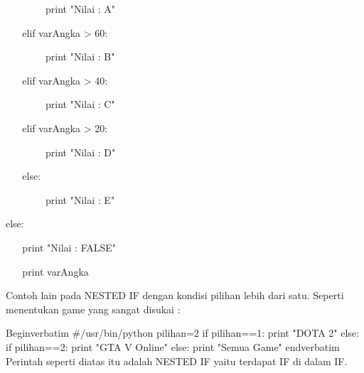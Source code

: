 \vspace{12pt}
\noindent 
 $  $  $  $  $  $  $  $  $  $  $  $  $  $  $  $  $  $  $  $  $  $  $  $ print "Nilai : A" \par
\vspace{12pt}
\noindent 
 $  $  $  $  $  $  $  $  $  $  $  $elif varAngka > 60: \par
\vspace{12pt}
\noindent 
 $  $  $  $  $  $  $  $  $  $  $  $  $  $  $  $  $  $  $  $  $  $  $  $ print "Nilai : B" \par
\vspace{12pt}
\noindent 
 $  $  $  $  $  $  $  $  $  $  $  $elif varAngka > 40: \par
\vspace{12pt}
\noindent 
 $  $  $  $  $  $  $  $  $  $  $  $  $  $  $  $  $  $  $  $  $  $  $  $ print "Nilai : C" \par
\vspace{12pt}
\noindent 
 $  $  $  $  $  $  $  $  $  $  $  $elif varAngka > 20: \par
\vspace{12pt}
\noindent 
 $  $  $  $  $  $  $  $  $  $  $  $  $  $  $  $  $  $  $  $  $  $  $  $ print "Nilai : D" \par
\vspace{12pt}
\noindent 
 $  $  $  $  $  $  $  $  $  $  $  $else: \par
\vspace{12pt}
\noindent 
 $  $  $  $  $  $  $  $  $  $  $  $  $  $  $  $  $  $  $  $  $  $  $  $ print "Nilai : E" \par
\vspace{12pt}
\noindent 
else: \par
\vspace{12pt}
\noindent 
 $  $  $  $  $  $  $  $  $  $  $  $print "Nilai : FALSE" \par
\vspace{12pt}
\noindent 
 $  $  $  $  $  $  $  $  $  $  $  $print varAngka \par
\vspace{12pt}
\noindent
Contoh lain pada NESTED IF dengan kondisi pilihan lebih dari satu. Seperti menentukan game yang sangat disukai : \par
\vspace{12}
\noindent 
Begin{verbatim}
#/usr/bin/python
pilihan=2
if pilihan==1:
        print "DOTA 2"
else:
        if pilihan==2:
		print "GTA V Online"
	else:
		print "Semua Game"
end{verbatim}
\noindent
Perintah seperti diatas itu adalah NESTED IF yaitu terdapat IF di dalam IF. \par
